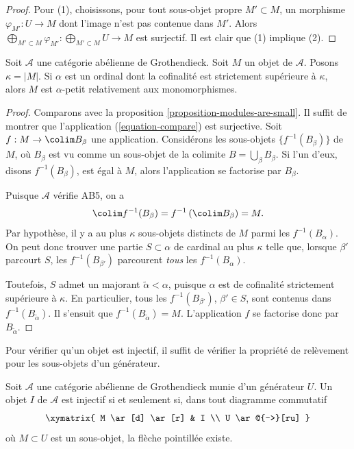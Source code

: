\begin{proof}
Pour (1), choisissons, pour tout sous-objet propre $M' \subset M$, un morphisme
$\varphi_{M'} : U \to M$ dont l'image n'est pas contenue dans $M'$. Alors
$\bigoplus_{M' \subset M} \varphi_{M'} : \bigoplus_{M' \subset M} U \to M$
est surjectif. Il est clair que (1) implique (2).
\end{proof}

\begin{proposition}
\label{proposition-objects-are-small}
Soit $\mathcal{A}$ une catégorie abélienne de Grothendieck. Soit $M$ un
objet de $\mathcal{A}$. Posons $\kappa = |M|$.
Si $\alpha$ est un ordinal dont la cofinalité est strictement supérieure
à $\kappa$, alors $M$ est $\alpha$-petit relativement aux monomorphismes.
\end{proposition}

\begin{proof}
Comparons avec la proposition \ref{proposition-modules-are-small}.
Il suffit de montrer que l'application (\ref{equation-compare}) est surjective.
Soit $f : M \to \colim B_\beta$ une application.
Considérons les sous-objets $\{f^{-1}(B_\beta)\}$ de $M$, où $B_\beta$
est vu comme un sous-objet de la colimite $B = \bigcup_\beta B_\beta$.
Si l'un d'eux, disons $f^{-1}(B_\beta)$, est égal à $M$,
alors l'application se factorise par $B_\beta$.

\medskip\noindent
Puisque $\mathcal{A}$ vérifie AB5, on a
$$
\colim f^{-1}(B_\beta) = f^{-1}\left(\colim B_\beta\right) = M.
$$
Par hypothèse, il y a au plus $\kappa$ sous-objets distincts de $M$ parmi
les $f^{-1}(B_\alpha)$.
On peut donc trouver une partie $S \subset \alpha$ de cardinal au plus
$\kappa$ telle que, lorsque $\beta'$ parcourt $S$, les
$f^{-1}(B_{\beta'})$ parcourent \emph{tous} les $f^{-1}(B_\alpha)$.

\medskip\noindent
Toutefois, $S$ admet un majorant $\widetilde{\alpha} < \alpha$, puisque
$\alpha$ est de cofinalité strictement supérieure à $\kappa$. En particulier,
tous les $f^{-1}(B_{\beta'})$, $\beta' \in S$, sont contenus dans
$f^{-1}(B_{\widetilde{\alpha}})$.
Il s'ensuit que $f^{-1}(B_{\widetilde{\alpha}}) = M$.
L'application $f$ se factorise donc par $B_{\widetilde{\alpha}}$.
\end{proof}

\begin{lemma}
\label{lemma-characterize-injective}
\begin{slogan}
Pour vérifier qu'un objet est injectif, il suffit de vérifier la propriété
de relèvement pour les sous-objets d'un générateur.
\end{slogan}
Soit $\mathcal{A}$ une catégorie abélienne de Grothendieck munie d'un
générateur $U$.
Un objet $I$ de $\mathcal{A}$ est injectif si et seulement si, dans tout
diagramme commutatif
$$
\xymatrix{
M \ar[d] \ar[r] &  I \\
U \ar@{-->}[ru]
}
$$
où $M \subset U$ est un sous-objet, la flèche pointillée existe.
\end{lemma}


